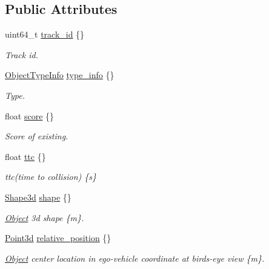 \subsection*{Public Attributes}
\begin{DoxyCompactItemize}
\item 
uint64\+\_\+t \hyperlink{structmaf__perception__interface_1_1PerceptionFusionAEBObjectData_ac094dcba03db8f82eec44991b11db9a2}{track\+\_\+id} \{\}
\begin{DoxyCompactList}\small\item\em Track id. \end{DoxyCompactList}\item 
\hyperlink{structmaf__perception__interface_1_1ObjectTypeInfo}{Object\+Type\+Info} \hyperlink{structmaf__perception__interface_1_1PerceptionFusionAEBObjectData_a221a8cb55a68ceaffb1db1e9008100c7}{type\+\_\+info} \{\}
\begin{DoxyCompactList}\small\item\em Type. \end{DoxyCompactList}\item 
float \hyperlink{structmaf__perception__interface_1_1PerceptionFusionAEBObjectData_a07dabbcbea6c8edc73128ff5ffc0e479}{score} \{\}
\begin{DoxyCompactList}\small\item\em Score of existing. \end{DoxyCompactList}\item 
float \hyperlink{structmaf__perception__interface_1_1PerceptionFusionAEBObjectData_a128e76ef29eafaf1ebf0b17dd2b6f5eb}{ttc} \{\}
\begin{DoxyCompactList}\small\item\em ttc(time to collision) \{s\} \end{DoxyCompactList}\item 
\hyperlink{structmaf__perception__interface_1_1Shape3d}{Shape3d} \hyperlink{structmaf__perception__interface_1_1PerceptionFusionAEBObjectData_a2278eaf38a60fcfe307fb0e9490ec55e}{shape} \{\}
\begin{DoxyCompactList}\small\item\em \hyperlink{structmaf__perception__interface_1_1Object}{Object} 3d shape \{m\}. \end{DoxyCompactList}\item 
\hyperlink{structmaf__perception__interface_1_1Point3d}{Point3d} \hyperlink{structmaf__perception__interface_1_1PerceptionFusionAEBObjectData_af2e82077c1b3355fa41a9dd7e1682c58}{relative\+\_\+position} \{\}
\begin{DoxyCompactList}\small\item\em \hyperlink{structmaf__perception__interface_1_1Object}{Object} center location in ego-\/vehicle coordinate at bird\textquotesingle{}s-\/eye view \{m\}. \end{DoxyCompactList}\item 

\end{DoxyCompactItemize}
